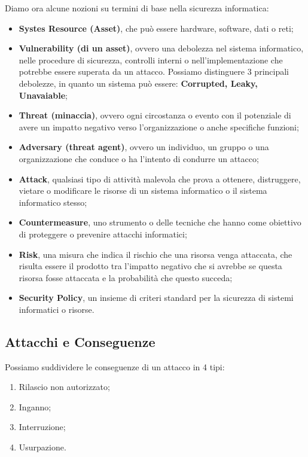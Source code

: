 \documentclass[14pt]{extarticle}
\begin{document}
\noindent Diamo ora alcune nozioni su termini di base nella sicurezza
informatica:

\begin{itemize}
    \item \textbf{Systes Resource (Asset)}, che può essere hardware, software,
    dati o reti;
    \item \textbf{Vulnerability (di un asset)}, ovvero una debolezza nel sistema
    informatico, nelle procedure di sicurezza, controlli interni o
    nell'implementazione che potrebbe essere superata da un attacco. Possiamo
    distinguere 3 principali debolezze, in quanto un sistema può essere:
    \textbf{Corrupted, Leaky, Unavaiable};
    \item \textbf{Threat (minaccia)}, ovvero ogni circostanza o evento con il
    potenziale di avere un impatto negativo verso l'organizzazione o anche
    specifiche funzioni;
    \item \textbf{Adversary (threat agent)}, ovvero un individuo, un gruppo o
    una organizzazione che conduce o ha l'intento di condurre un attacco;
    \item \textbf{Attack}, qualsiasi tipo di attività malevola che prova a
    ottenere, distruggere, vietare o modificare le risorse di un sistema
    informatico o il sistema informatico stesso;
    \item \textbf{Countermeasure}, uno strumento o delle tecniche che hanno come
    obiettivo di proteggere o prevenire attacchi informatici;
    \item \textbf{Risk}, una misura che indica il rischio che una risorsa venga
    attaccata, che risulta essere il prodotto tra l'impatto negativo che si
    avrebbe se questa risorsa fosse attaccata e la probabilità che questo
    succeda;
    \item \textbf{Security Policy}, un insieme di criteri standard per la
    sicurezza di sistemi informatici o risorse.     
\end{itemize}

\subsection{Attacchi e Conseguenze}

Possiamo suddividere le conseguenze di un attacco in 4 tipi:
\begin{enumerate}
    \item Rilascio non autorizzato;
    \item Inganno;
    \item Interruzione;
    \item Usurpazione.
\end{enumerate}
\end{document}
